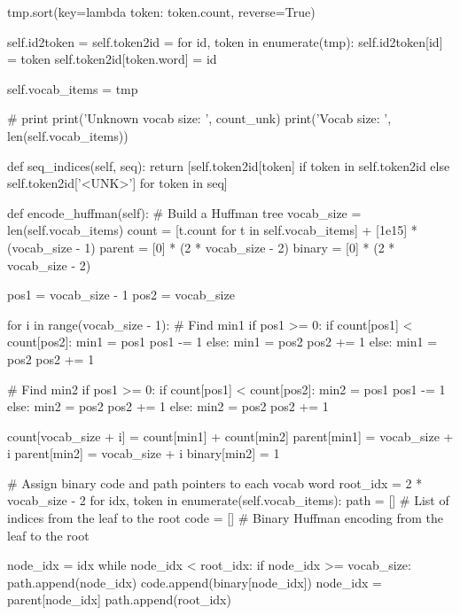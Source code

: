 \begin{python}
        tmp.sort(key=lambda token: token.count, reverse=True)

        self.id2token = {}
        self.token2id = {}
        for id, token in enumerate(tmp):
            self.id2token[id] = token
            self.token2id[token.word] = id

        self.vocab_items = tmp

        # print
        print('Unknown vocab size: ', count_unk)
        print('Vocab size: ', len(self.vocab_items))

    def seq_indices(self, seq):
        return [self.token2id[token] if token in self.token2id else self.token2id['<UNK>'] for token in seq]

    def encode_huffman(self):
        # Build a Huffman tree
        vocab_size = len(self.vocab_items)
        count = [t.count for t in self.vocab_items] + [1e15] * (vocab_size - 1)
        parent = [0] * (2 * vocab_size - 2)
        binary = [0] * (2 * vocab_size - 2)

        pos1 = vocab_size - 1
        pos2 = vocab_size

        for i in range(vocab_size - 1):
            # Find min1
            if pos1 >= 0:
                if count[pos1] < count[pos2]:
                    min1 = pos1
                    pos1 -= 1
                else:
                    min1 = pos2
                    pos2 += 1
            else:
                min1 = pos2
                pos2 += 1

            # Find min2
            if pos1 >= 0:
                if count[pos1] < count[pos2]:
                    min2 = pos1
                    pos1 -= 1
                else:
                    min2 = pos2
                    pos2 += 1
            else:
                min2 = pos2
                pos2 += 1

            count[vocab_size + i] = count[min1] + count[min2]
            parent[min1] = vocab_size + i
            parent[min2] = vocab_size + i
            binary[min2] = 1

        # Assign binary code and path pointers to each vocab word
        root_idx = 2 * vocab_size - 2
        for idx, token in enumerate(self.vocab_items):
            path = []  # List of indices from the leaf to the root
            code = []  # Binary Huffman encoding from the leaf to the root

            node_idx = idx
            while node_idx < root_idx:
                if node_idx >= vocab_size: path.append(node_idx)
                code.append(binary[node_idx])
                node_idx = parent[node_idx]
            path.append(root_idx)


\end{python}
